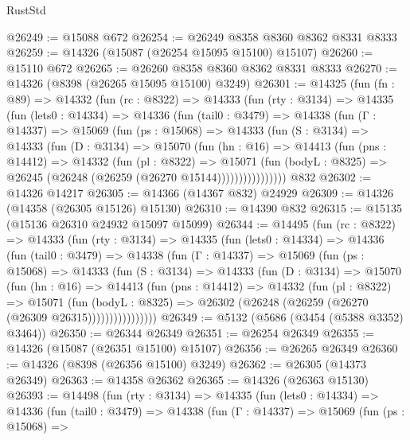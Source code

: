 \begin{lexlean}{RustStd}
\begin{coremodule}
@26249 := @15088 @672
@26254 := @26249 @8358 @8360 @8362 @8331 @8333
@26259 := @14326 (@15087 (@26254 @15095 @15100) @15107)
@26260 := @15110 @672
@26265 := @26260 @8358 @8360 @8362 @8331 @8333
@26270 := @14326 (@8398 (@26265 @15095 @15100) @3249)
@26301 := @14325
    (fun (fn : @89) =>
    @14332
      (fun (rc : @8322) =>
      @14333
        (fun (rty : @3134) =>
        @14335
          (fun (lets0 : @14334) =>
          @14336
            (fun (tail0 : @3479) =>
            @14338
              (fun (Γ : @14337) =>
              @15069
                (fun (ps : @15068) =>
                @14333
                  (fun (S : @3134) =>
                  @14333
                    (fun (D : @3134) =>
                    @15070
                      (fun (hn : @16) =>
                      @14413
                        (fun (pns : @14412) =>
                        @14332
                          (fun (pl : @8322) =>
                          @15071
                            (fun (bodyL : @8325) =>
                            @26245 (@26248 (@26259 (@26270 @15144))))))))))))))))
    @832
@26302 := @14326 @14217
@26305 := @14366 (@14367 @832) @24929
@26309 := @14326 (@14358 (@26305 @15126) @15130)
@26310 := @14390 @832
@26315 := @15135 (@15136 @26310 @24932 @15097 @15099)
@26344 := @14495
    (fun (rc : @8322) =>
    @14333
      (fun (rty : @3134) =>
      @14335
        (fun (lets0 : @14334) =>
        @14336
          (fun (tail0 : @3479) =>
          @14338
            (fun (Γ : @14337) =>
            @15069
              (fun (ps : @15068) =>
              @14333
                (fun (S : @3134) =>
                @14333
                  (fun (D : @3134) =>
                  @15070
                    (fun (hn : @16) =>
                    @14413
                      (fun (pns : @14412) =>
                      @14332
                        (fun (pl : @8322) =>
                        @15071
                          (fun (bodyL : @8325) =>
                          @26302 (@26248 (@26259 (@26270 (@26309 @26315))))))))))))))))
@26349 := @5132 (@5686 (@3454 (@5388 @3352) @3464))
@26350 := @26344 @26349
@26351 := @26254 @26349
@26355 := @14326 (@15087 (@26351 @15100) @15107)
@26356 := @26265 @26349
@26360 := @14326 (@8398 (@26356 @15100) @3249)
@26362 := @26305 (@14373 @26349)
@26363 := @14358 @26362
@26365 := @14326 (@26363 @15130)
@26393 := @14498
    (fun (rty : @3134) =>
    @14335
      (fun (lets0 : @14334) =>
      @14336
        (fun (tail0 : @3479) =>
        @14338
          (fun (Γ : @14337) =>
          @15069
            (fun (ps : @15068) =>

\end{coremodule}
\end{lexlean}
